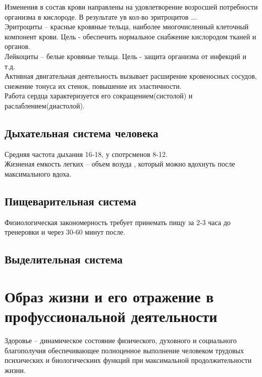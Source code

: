 \documentclass[a4paper, 12pt]{article}
\begin{document}
Изменения в состав крови направлены на удовлетворение возросшей потребности организма в кислороде. В результате ув кол-во эритроцитов ... \\

Эритроциты -- красные кровяные тельца, наиболее многочисленный клеточный компонент крови. Цель - обеспечить нормальное снабжение кислородом тканей и органов.\\

Лейкоциты -- белые кровяные тельца. Цель - защита организма от инфекций и т.д.\\

Активная двигательная деятельность вызывает расширение кровеносных сосудов, снежение тонуса их стенок, повышение их эластичности.\\

Работа сердца характеризуется его сокращением(систолой) и раслаблением(диастолой).\\

\subsection*{Дыхательная система человека}

Средняя частота дыхания 16-18, у спотрсменов 8-12.\\

Жизненая емкость легких -- объем возуда , который можно вдохнуть после максимального вдоха.\\

\subsection*{Пищеварительная система}

Физиологическая закономерность требует принемать пищу за 2-3 часа до тренеровки и через 30-60 минут после.\\

\subsection*{Выделительная система}

\newpage
\section*{Образ жизни и его отражение в профуссиональной деятельности}
Здоровье -- динамическое состояние физического, духовного и социального благополучия обеспечивающее полноценное выполнение человеком трудовых психических и биологическиих функций при максимальной продолжительности жизни.\\
\end{document}
